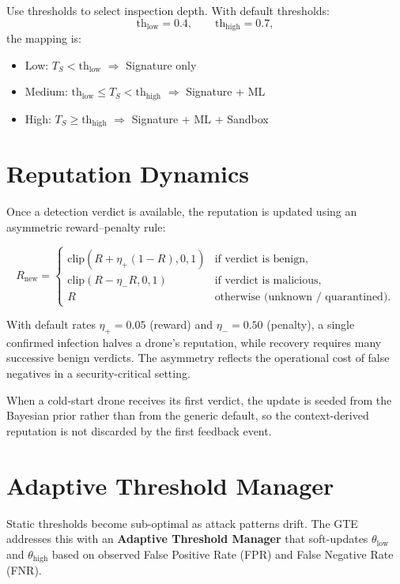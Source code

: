 \documentclass[12pt, a4paper]{report}
\begin{document}
Use thresholds to select inspection depth. With default thresholds:
\[
\text{th}_{\text{low}} = 0.4, \qquad \text{th}_{\text{high}} = 0.7,
\]
the mapping is:

\begin{itemize}
    \item Low: $T_S < \text{th}_{\text{low}}$  
          $\Rightarrow$ Signature only
    \item Medium: $\text{th}_{\text{low}} \le T_S < \text{th}_{\text{high}}$  
          $\Rightarrow$ Signature + ML
    \item High: $T_S \ge \text{th}_{\text{high}}$  
          $\Rightarrow$ Signature + ML + Sandbox
\end{itemize}



\section{Reputation Dynamics}

Once a detection verdict is available, the reputation is updated using
an asymmetric reward--penalty rule:

\[
R_{\text{new}} =
\begin{cases}
\text{clip}(R + \eta_+ (1 - R), 0, 1) & \text{if verdict is benign}, \\
\text{clip}(R - \eta_- R, 0, 1) & \text{if verdict is malicious}, \\
R & \text{otherwise (unknown / quarantined)}.
\end{cases}
\]

With default rates $\eta_+ = 0.05$ (reward) and $\eta_- = 0.50$
(penalty), a single confirmed infection halves a drone's reputation,
while recovery requires many successive benign verdicts. The asymmetry
reflects the operational cost of false negatives in a
security-critical setting.

When a cold-start drone receives its first verdict, the update is
seeded from the Bayesian prior rather than from the generic default,
so the context-derived reputation is not discarded by the first
feedback event.


\section{Adaptive Threshold Manager}

Static thresholds become sub-optimal as attack patterns drift. The GTE
addresses this with an \textbf{Adaptive Threshold Manager} that
soft-updates $\theta_{\text{low}}$ and $\theta_{\text{high}}$ based on
observed False Positive Rate (FPR) and False Negative Rate (FNR).
\end{document}
